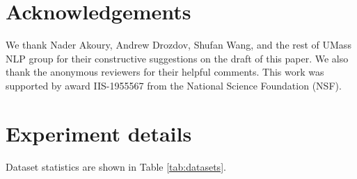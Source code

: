 \documentclass[11pt]{article}
\begin{document}
\section*{Acknowledgements}
We thank Nader Akoury, Andrew Drozdov, Shufan Wang, and the rest of UMass NLP group for their constructive suggestions on the draft of this paper. We also thank the anonymous reviewers for their helpful comments. This work was supported by award IIS-1955567 from the National Science Foundation (NSF).



\newpage
\appendix

\section{Experiment details} \label{sec:appendix-exp}



\begin{table} [ht]
    \centering
    \caption{Dataset statistics}
    \label{tab:datasets}
\end{table}
Dataset statistics are shown in Table \ref{tab:datasets}. 

\begin{table}[ht]
    \centering
    \caption{Training sequence length as well as scored target length and total test sequence length during evaluation we used on each dataset.}
    \label{tab:eval-config}
\end{table}
\end{document}
